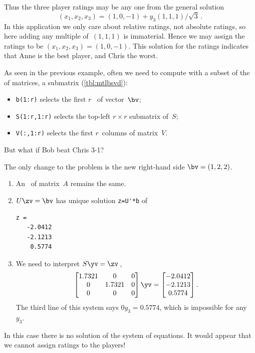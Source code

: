 \begin{example}
\begin{solution}
Thus the three player ratings may be any one from the general solution
\begin{displaymath}
    (x_1,x_2,x_3) =(1,0,-1)
    +y_3(1,1,1)/\sqrt3\,.
\end{displaymath}
In this application we only care about relative ratings, not absolute ratings, so here adding any multiple of~\((1,1,1)\) is immaterial.
Hence we may assign the ratings to be \((x_1,x_2,x_3) =(1,0,-1)\).
This solution for the ratings indicates that Anne is the best player, and Chris the worst. 
\end{solution}
\end{example}


\begin{compute}
As seen in the previous example, often we need to compute with a subset of the  of matrices, a submatrix (\cref{tbl:mtlbsvd}):
\begin{itemize}
\item \verb|b(1:r)| selects the first \(r\)~ of vector~\(\bv\);
\item \verb|S(1:r,1:r)| selects the top-left \(r\times r\) submatrix of~\(S\);
\item \verb|V(:,1:r)| selects the first \(r\)~columns of matrix~\(V\).
\end{itemize}
\end{compute}



\begin{example} \label{eg:rstp2}
But what if Bob beat Chris 3-1?  
\begin{solution} 
The only change to the problem is the new right-hand side \(\bv=(1,2,2)\).
\begin{enumerate}
\item An \svd\ of matrix~\(A\) remains the same.
\item \(U\zv=\bv\) has unique solution \verb|z=U'*b| of
\begin{verbatim}
z =
   -2.0412
   -2.1213
    0.5774
\end{verbatim}
\item We need to interpret \(S\yv=\zv\)\,,
\begin{equation*}
\begin{bmatrix} 1.7321&0&0
\\0&1.7321&0
\\0&0&0 \end{bmatrix}\yv=\begin{bmatrix} 
   -2.0412\\-2.1213\\0.5774
\end{bmatrix}.
\end{equation*}
The third line of this system says \(0y_3=0.5774\), which is impossible for any~\(y_3\).
\end{enumerate}
In this case there is no solution of the system of equations.
It would appear that we cannot assign ratings to the players!  
\end{solution}
\end{example}

